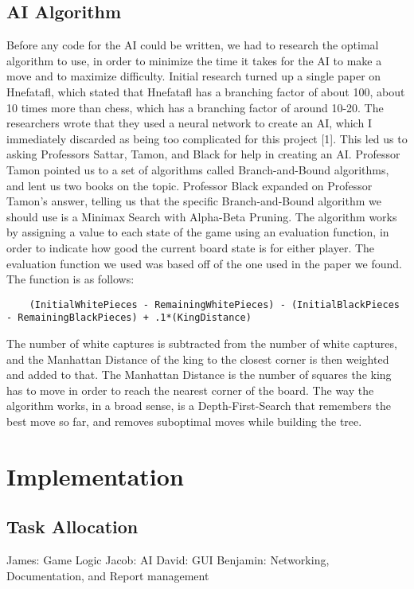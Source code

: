 \documentclass{article}
\begin{document}
\subsection{AI Algorithm}
	Before any code for the AI could be written, we had to research the optimal algorithm to use, in order to minimize the time it takes for the AI to make a move and to maximize difficulty. Initial research turned up a single paper on Hnefatafl, which stated that Hnefatafl has a branching factor of about 100, about 10 times more than chess, which has a branching factor of around 10-20. The researchers wrote that they used a neural network to create an AI, which I immediately discarded as being too complicated for this project [1]. This led us to asking Professors Sattar, Tamon, and Black for help in creating an AI. Professor Tamon pointed us to a set of algorithms called Branch-and-Bound algorithms, and lent us two books on the topic. Professor Black expanded on Professor Tamon's answer, telling us that the specific Branch-and-Bound algorithm we should use is a Minimax Search with Alpha-Beta Pruning. The algorithm works by assigning a value to each state of the game using an evaluation function, in order to indicate how good the current board state is for either player. The evaluation function we used was based off of the one used in the paper we found. The function is as follows:
\begin{lstlisting}
	(InitialWhitePieces - RemainingWhitePieces) - (InitialBlackPieces - RemainingBlackPieces) + .1*(KingDistance)
\end{lstlisting}
The number of white captures is subtracted from the number of white captures, and the Manhattan Distance of the king to the closest corner is then weighted and added to that. The Manhattan Distance is the number of squares the king has to move in order to reach the nearest corner of the board.
	The way the algorithm works, in a broad sense, is a Depth-First-Search that remembers the best move so far, and removes suboptimal moves while building the tree. 

\section{Implementation}

\subsection{Task Allocation}
James: Game Logic\newline
Jacob: AI\newline
David: GUI\newline
Benjamin: Networking, Documentation, and Report management
\end{document}
